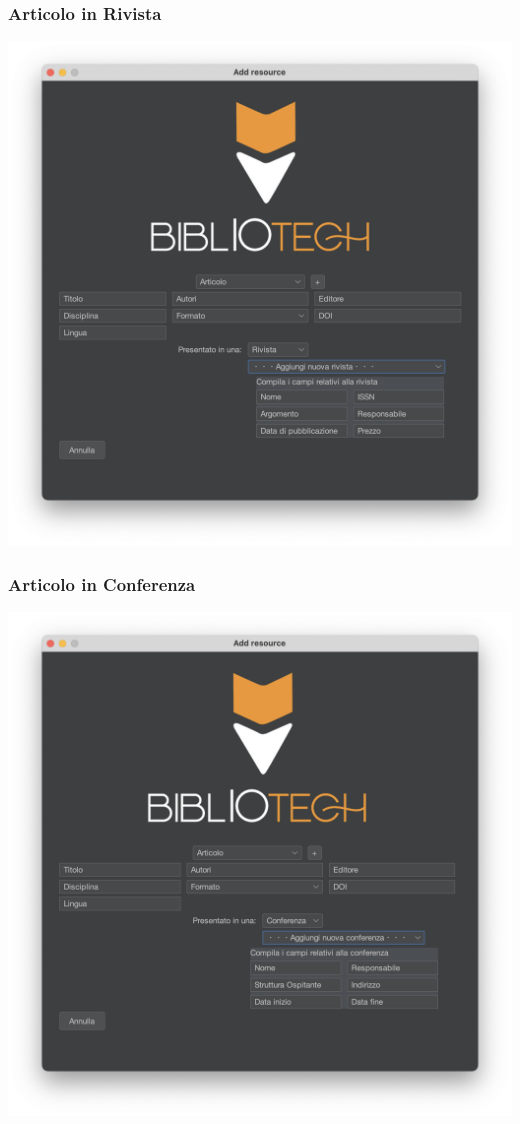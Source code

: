  \subsubsection{Articolo in Rivista}
 \includegraphics[scale=0.25, center]{Immagini/Schermate/Insert/InserisciRisorsaPage-ArticoloRivista.png}
 \subsubsection{Articolo in Conferenza}
 \includegraphics[scale=0.25, center]{Immagini/Schermate/Insert/InserisciRisorsaPage-ArticoliConferenza.png}

